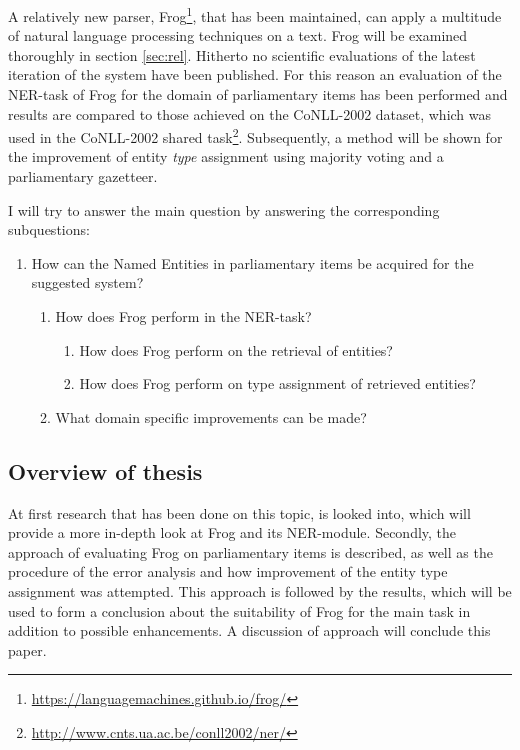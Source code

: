 A relatively new parser, Frog\footnote{\url{https://languagemachines.github.io/frog/}}, that has been maintained, can apply a multitude of natural language processing techniques on a text. Frog will be examined thoroughly in section \ref{sec:rel}. Hitherto no scientific evaluations of the latest iteration of the system have been published. For this reason an evaluation of  the NER-task of Frog for the domain of parliamentary items has been performed and results are compared to those achieved on the CoNLL-2002 dataset, which was used in the CoNLL-2002 shared task\footnote{\url{http://www.cnts.ua.ac.be/conll2002/ner/}}. Subsequently, a method will be shown for the improvement of entity \textit{type} assignment using majority voting and a parliamentary gazetteer.

I will try to answer the main question by answering the corresponding subquestions:
\begin{enumerate}
    \item How can the Named Entities in parliamentary items be acquired for the suggested system?
    \begin{enumerate}
        \item   How does Frog perform in the NER-task? 
	\begin{enumerate}
	\item How does Frog perform on the retrieval of entities? 
	\item How does Frog perform on type assignment of retrieved entities?
	\end{enumerate}
        \item What domain specific improvements can be made?
    \end{enumerate}
\end{enumerate}

\subsection{Overview of thesis}
At first research that has been done on this topic, is looked into, which will provide a more in-depth look at Frog and its NER-module. Secondly, the approach of evaluating Frog on parliamentary items is described, as well as the procedure of the error analysis and how improvement of the entity type assignment was attempted. This approach is followed by the results, which will be used to form a conclusion about the suitability of Frog for the main task in addition to possible enhancements. A discussion of approach will conclude this paper.
